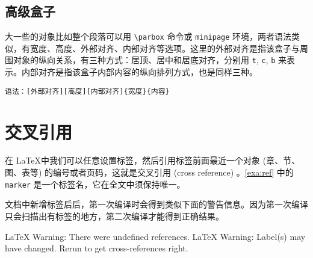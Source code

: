 \begin{example}[htbp]
\caption{ \texttt{makebox}和 \texttt{framebox}}
\label{exa:makebox}
\end{example}

\subsection{高级盒子}

大一些的对象比如整个段落可以用 \verb|\parbox| 命令或 \texttt{minipage} 环境，两者语法类似，有宽度、高度、外部对齐、内部对齐等选项。这里的外部对齐是指该盒子与周围对象的纵向关系，有三种方式：居顶、居中和居底对齐，分别用 \texttt{t}, \texttt{c}, \texttt{b} 来表示。内部对齐是指该盒子内部内容的纵向排列方式，也是同样三种。

\verb|语法：[外部对齐][高度][内部对齐]{宽度}{内容}|

\begin{example}[htbp]

\caption{\texttt{parbox} 和 \texttt{minipage}}
\label{exa:parbox}
\end{example}


\section{交叉引用}
\label{sec:crossref}

在 \LaTeX 中我们可以任意设置标签，然后引用标签前面最近一个对象 (章、节、图、表等) 的编号或者页码，这就是交叉引用 (cross reference) 。\autoref{exa:ref} 中的 \texttt{marker} 是一个标签名，它在全文中须保持唯一。

\begin{example}[h]
\caption{交叉引用}
\label{exa:ref}
\end{example}

文档中新增标签后后，第一次编译时会得到类似下面的警告信息。因为第一次编译只会扫描出有标签的地方，第二次编译才能得到正确结果。

\begin{Code}[]
LaTeX Warning: There were undefined references.
LaTeX Warning: Label(s) may have changed. Rerun to get cross-references right.
\end{Code}



